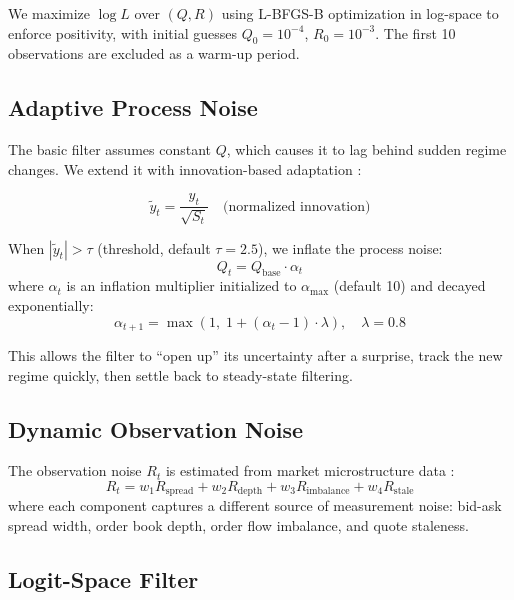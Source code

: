 \documentclass[11pt, a4paper]{article}
\begin{document}
We maximize $\log L$ over $(Q, R)$ using L-BFGS-B optimization in log-space to enforce positivity, with initial guesses $Q_0 = 10^{-4}$, $R_0 = 10^{-3}$. The first 10 observations are excluded as a warm-up period.

\subsection{Adaptive Process Noise}

The basic filter assumes constant $Q$, which causes it to lag behind sudden regime changes. We extend it with innovation-based adaptation \citep{mehra1972, mohamed1999}:

\begin{equation}
    \tilde{y}_t = \frac{y_t}{\sqrt{S_t}} \quad \text{(normalized innovation)}
\end{equation}

When $|\tilde{y}_t| > \tau$ (threshold, default $\tau = 2.5$), we inflate the process noise:
\begin{equation}
    Q_t = Q_{\text{base}} \cdot \alpha_t
\end{equation}
where $\alpha_t$ is an inflation multiplier initialized to $\alpha_{\text{max}}$ (default 10) and decayed exponentially:
\begin{equation}
    \alpha_{t+1} = \max\left(1, \; 1 + (\alpha_t - 1) \cdot \lambda\right), \quad \lambda = 0.8
\end{equation}

This allows the filter to ``open up'' its uncertainty after a surprise, track the new regime quickly, then settle back to steady-state filtering.

\subsection{Dynamic Observation Noise}

The observation noise $R_t$ is estimated from market microstructure data \citep{hasbrouck2007}:
\begin{equation}
    R_t = w_1 R_{\text{spread}} + w_2 R_{\text{depth}} + w_3 R_{\text{imbalance}} + w_4 R_{\text{stale}}
\end{equation}
where each component captures a different source of measurement noise: bid-ask spread width, order book depth, order flow imbalance, and quote staleness.

\subsection{Logit-Space Filter}
\end{document}

